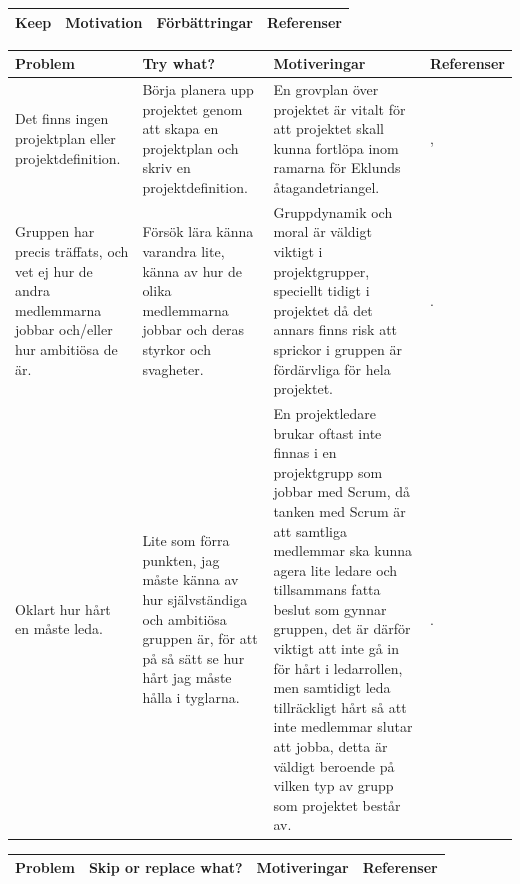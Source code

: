 \documentclass[conference,a4paper]{IEEEtran}
\newcommand\Tstrut{\rule{0pt}{2.6ex}}       %
\newcommand\Bstrut{\rule[-0.9ex]{0pt}{0pt}} %
\newcommand{\TBstrut}{\Tstrut\Bstrut} %
\begin{document}
\begin{table}[H]
	\small
  \centering
	\begin{tabular}{|p{1.5cm}|p{2cm}|p{1.8cm}|p{1.5cm}|} %
    \hline
    Keep & Motivation & Förbättringar & Referenser \TBstrut \\
    \hline
  \end{tabular}
\end{table}

\begin{table}[H]
	\small
  \centering
	\begin{tabular}{|p{1.5cm}|p{2cm}|p{1.8cm}|p{1.5cm}|} %
    \hline
    Problem & Try what? & Motiveringar & Referenser \TBstrut \\
    \hline
    Det finns ingen projektplan eller projektdefinition. & Börja planera upp projektet genom att skapa en projektplan och skriv en projektdefinition. & En grovplan över projektet är vitalt för att projektet skall kunna fortlöpa inom ramarna för Eklunds åtagandetriangel. & \cite[s. 128]{Eklund14}, \cite[s. 72]{Sommerville10} \TBstrut \\
    \hline
    Gruppen har precis träffats, och vet ej hur de andra medlemmarna jobbar och/eller hur ambitiösa de är. & Försök lära känna varandra lite, känna av hur de olika medlemmarna jobbar och deras styrkor och svagheter. & Gruppdynamik och moral är väldigt viktigt i projektgrupper, speciellt tidigt i projektet då det annars finns risk att sprickor i gruppen är fördärvliga för hela projektet. & \cite[kap. 7]{Eklund14}. \TBstrut \\
    \hline
    Oklart hur hårt en måste leda. & Lite som förra punkten, jag måste känna av hur självständiga och ambitiösa gruppen är, för att på så sätt se hur hårt jag måste hålla i tyglarna. & En projektledare brukar oftast inte finnas i en projektgrupp som jobbar med Scrum, då tanken med Scrum är att samtliga medlemmar ska kunna agera lite ledare och tillsammans fatta beslut som gynnar gruppen, det är därför viktigt att inte gå in för hårt i ledarrollen, men samtidigt leda tillräckligt hårt så att inte medlemmar slutar att jobba, detta är väldigt beroende på vilken typ av grupp som projektet består av. & \cite[s. 73-74]{Sommerville10}. \TBstrut \\
    \hline
  \end{tabular}
\end{table}

\begin{table}[H]
	\small
  \centering
	\begin{tabular}{|p{1.5cm}|p{2cm}|p{1.8cm}|p{1.5cm}|} %
    \hline
    Problem & Skip or replace what? & Motiveringar & Referenser \TBstrut \\
    \hline
  \end{tabular}
\end{table}
\end{document}
